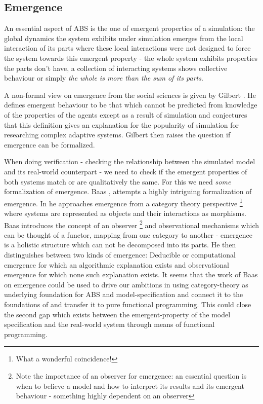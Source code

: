 \subsection{Emergence}
An essential aspect of ABS is the one of emergent properties of a simulation: the global dynamics the system exhibits under simulation emerges from the local interaction of its parts where these local interactions were not designed to force the system towards this emergent property - the whole system exhibits properties the parts don't have, a collection of interacting systems shows collective behaviour \cite{baas_emergence_1997} or simply \textit{the whole is more than the sum of its parts}.

A non-formal view on emergence from the social sciences is given by Gilbert \cite{gilbert_holism_1996}. He defines emergent behaviour to be that which cannot be predicted from knowledge of the properties of the agents except as a result of simulation and conjectures that this definition gives an explanation for the popularity of simulation for researching complex adaptive systems. Gilbert then raises the question if emergence can be formalized.

When doing verification - checking the relationship between the simulated model and its real-world counterpart - we need to check if the emergent properties of both systems match or are qualitatively the same. For this we need \textit{some} formalization of emergence.
Baas \cite{baas_emergence_1994}, \cite{baas_emergence_1997} attempts a highly intriguing formalization of emergence. In \cite{baas_emergence_1997} he approaches emergence from a category theory perspective \footnote{What a wonderful coincidence!} where systems are represented as objects and their interactions as morphisms. Baas introduces the concept of an observer \footnote{Note the importance of an observer for emergence: an essential question is when to believe a model and how to interpret its results and its emergent behaviour - something highly dependent on an observer} and observational mechanisms which can be thought of a functor, mapping from one category to another - emergence is a holistic structure which can not be decomposed into its parts. He then distinguishes between two kinds of emergence: Deducible or computational emergence for which an algorithmic explanation exists and observational emergence for which none such explanation exists. It seems that the work of Baas on emergence could be used to drive our ambitions in using category-theory as underlying foundation for ABS and model-specification and connect it to the foundations of and transfer it to pure functional programming. This could close the second gap which exists between the emergent-property of the model specification and the real-world system through means of functional programming.

